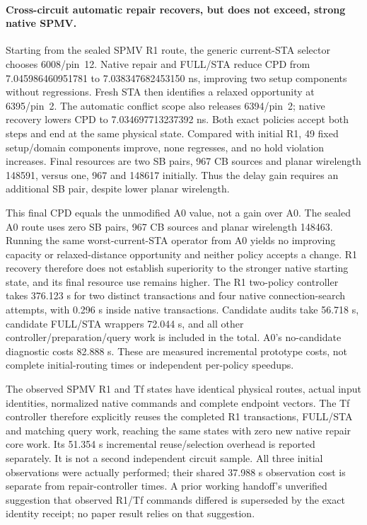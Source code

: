 \paragraph{Cross-circuit automatic repair recovers, but does not exceed, strong native SPMV.}
Starting from the sealed SPMV R1 route, the generic current-STA selector chooses 6008/pin~12. Native repair and FULL/STA reduce CPD from 7.045986460951781 to 7.038347682453150 ns, improving two setup components without regressions. Fresh STA then identifies a relaxed opportunity at 6395/pin~2. The automatic conflict scope also releases 6394/pin~2; native recovery lowers CPD to 7.034697713237392 ns. Both exact policies accept both steps and end at the same physical state. Compared with initial R1, 49 fixed setup/domain components improve, none regresses, and no hold violation increases. Final resources are two SB pairs, 967 CB sources and planar wirelength 148591, versus one, 967 and 148617 initially. Thus the delay gain requires an additional SB pair, despite lower planar wirelength.

This final CPD equals the unmodified A0 value, not a gain over A0. The sealed A0 route uses zero SB pairs, 967 CB sources and planar wirelength 148463. Running the same worst-current-STA operator from A0 yields no improving capacity or relaxed-distance opportunity and neither policy accepts a change. R1 recovery therefore does not establish superiority to the stronger native starting state, and its final resource use remains higher. The R1 two-policy controller takes 376.123 s for two distinct transactions and four native connection-search attempts, with 0.296 s inside native transactions. Candidate audits take 56.718 s, candidate FULL/STA wrappers 72.044 s, and all other controller/preparation/query work is included in the total. A0's no-candidate diagnostic costs 82.888 s. These are measured incremental prototype costs, not complete initial-routing times or independent per-policy speedups.

The observed SPMV R1 and Tf states have identical physical routes, actual input identities, normalized native commands and complete endpoint vectors. The Tf controller therefore explicitly reuses the completed R1 transactions, FULL/STA and matching query work, reaching the same states with zero new native repair core work. Its 51.354 s incremental reuse/selection overhead is reported separately. It is not a second independent circuit sample. All three initial observations were actually performed; their shared 37.988 s observation cost is separate from repair-controller times. A prior working handoff's unverified suggestion that observed R1/Tf commands differed is superseded by the exact identity receipt; no paper result relies on that suggestion.

